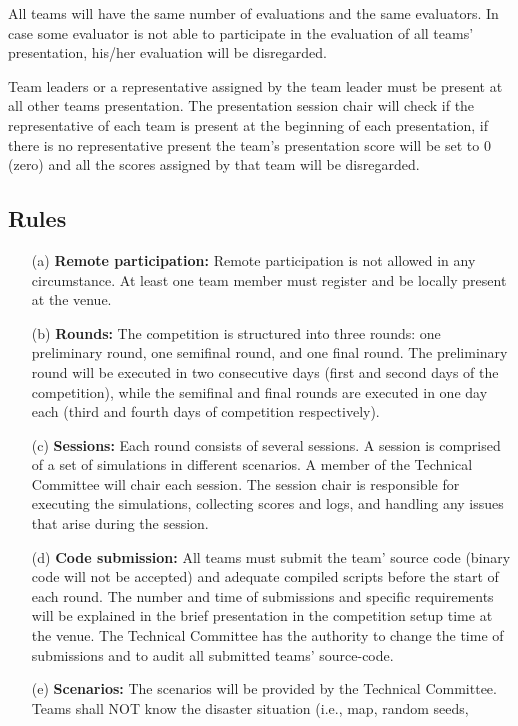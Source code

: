 \documentclass{article}
\begin{document}
All teams will have the same number of evaluations and the same evaluators. In 
case some evaluator is not able to participate in the evaluation of all teams' 
presentation, his/her evaluation will be disregarded.

Team leaders or a representative assigned by the team leader must be present
at all other teams presentation. The presentation session chair will check if
the representative of each team is present at the beginning of each
presentation, if there is no representative present the team's presentation
score will be set to 0 (zero) and all the scores assigned by that team will be
disregarded.
\subsection{Rules}
\label{sec:rules}
\begin{itemize}
\item[(a)] \textbf{Remote participation:} Remote participation is not allowed in
any circumstance. At least one team member must register and be locally present
at the venue.
\item[(b)] \textbf{Rounds:} The competition is structured into three rounds: 
one preliminary round, one semifinal round, and one final round. The preliminary
round will be executed in two consecutive days (first and second days of the
competition), while the semifinal and final rounds are executed in one day each
(third and fourth days of competition respectively).
\item[(c)] \textbf{Sessions:} Each round consists of several sessions. A session
is comprised of a set of simulations in different scenarios. A member of the
Technical Committee will chair each session. The session chair is responsible
for executing the simulations, collecting scores and logs, and handling any
issues that arise during the session.
\item[(d)] \textbf{Code submission:} All teams must submit the team' source 
code (binary code will not be accepted) and adequate compiled scripts before the
start of each round. The number and time of submissions and specific
requirements will be explained in the brief presentation in the competition
setup time at the venue. The Technical Committee has the authority to change the
time of submissions and to audit all submitted teams' source-code.
\item[(e)] \textbf{Scenarios:} The scenarios will be provided by the Technical 
Committee. Teams shall NOT know the disaster situation (i.e., map, random seeds,

\end{itemize}
\end{document}
